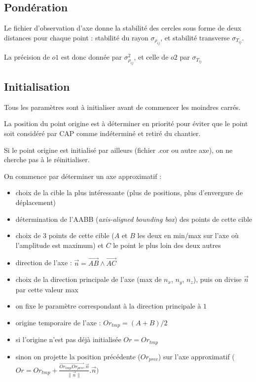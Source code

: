 \documentclass[french]{report}
\begin{document}
\subsection{Pondération}

Le fichier d'observation d'axe donne la stabilité des cercles sous forme de deux distances pour chaque point : stabilité du rayon $\sigma_{\rho_{ij}}$, et stabilité transverse $\sigma_{T_{ij}}$.

La précision de $o1$ est donc donnée par $\sigma_{\rho_{ij}} ^2$, et celle de $o2$ par $\sigma_{T_{ij}}$


\subsection{Initialisation}

Tous les paramètres sont à initialiser avant de commencer les moindres carrés.

La position du point origine est à déterminer en priorité pour éviter que le point soit
considéré par CAP comme indéterminé et retiré du chantier.

Si le point origine est initialisé par ailleurs (fichier .cor ou autre axe), on ne cherche pas à le réinitialiser.

On commence par déterminer un axe approximatif :
\begin{itemize}
\item choix de la cible la plus intéressante (plus de positions, plus d'envergure de déplacement)
\item détermination de l'AABB (\textit{axis-aligned bounding box}) des points de cette cible
\item choix de 3 points de cette cible ($A$ et $ B$ les deux en min/max sur l'axe où l'amplitude est maximum) et $C$ le point le plus loin des deux autres
\item direction de l'axe : $\overrightarrow{n} = \overrightarrow{AB}\wedge\overrightarrow{AC}$
\item choix de la direction principale de l'axe (max de $n_x$, $n_y$, $n_z$), puis on divise $\overrightarrow{n}$ par cette valeur max
\item on fixe le paramètre correspondant à la direction principale à $1$
\item origine temporaire de l'axe : $Or_{tmp} = (A+B)/2$
\item si l'origine n'est pas déjà initialisée $Or=Or_{tmp}$
\item sinon on projette la position précédente ($Or_{prec}$) sur l'axe approximatif ($Or=Or_{tmp}+\frac{\overrightarrow{Or_{tmp} Or_{prec}}.\overrightarrow{n}}
												{\parallel \overrightarrow{n} \parallel}.\overrightarrow{n})$
\end{itemize}
\end{document}
